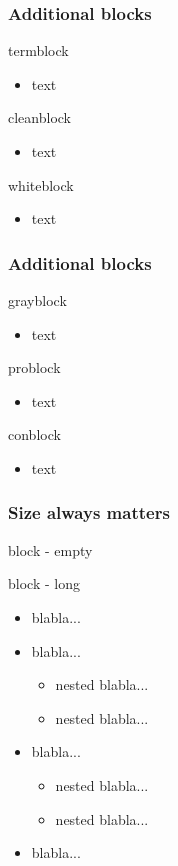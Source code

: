 \documentclass[t,compress,aspectratio=169]{beamer}
\begin{document}
\begin{frame}
\frametitle{Additional blocks}
\begin{termblock}{termblock}
\begin{itemize} \item text \end{itemize}
\end{termblock}
\begin{cleanblock}{cleanblock}
\begin{itemize} \item text \end{itemize}
\end{cleanblock}
\begin{whiteblock}{whiteblock}
\begin{itemize} \item text \end{itemize}
\end{whiteblock}
\end{frame}

\begin{frame}
\frametitle{Additional blocks}
\begin{grayblock}{grayblock}
\begin{itemize} \item text \end{itemize}
\end{grayblock}
\begin{problock}{problock}
\begin{itemize} \item text \end{itemize}
\end{problock}
\begin{conblock}{conblock}
\begin{itemize} \item text \end{itemize}
\end{conblock}
\end{frame}

\begin{frame}
\frametitle{Size always matters}
\begin{block}{block - empty}\end{block}
\begin{block}{block - long}
  \begin{itemize}
    \item blabla...
    \item blabla...
    \begin{itemize}
      \item nested blabla...
      \item nested blabla...
    \end{itemize}
    \item blabla...
    \begin{itemize}
    \item nested blabla...
    \item nested blabla...
    \end{itemize}
    \item blabla...
  \end{itemize}
\end{block}
\end{frame}
\end{document}
